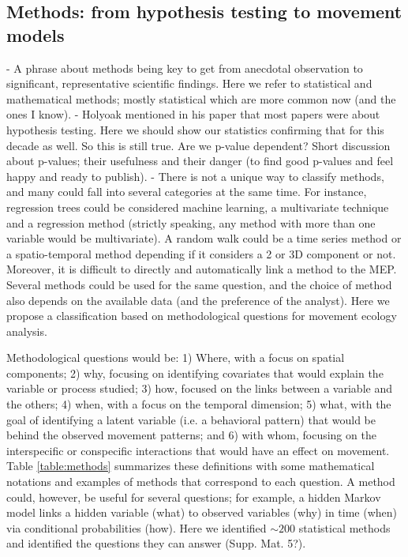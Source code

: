 \documentclass[9pt,twocolumn,twoside,lineno]{pnas-new}
\begin{document}
\subsection*{Methods: from hypothesis testing to movement models}

- A phrase about methods being key to get from anecdotal observation to significant, representative scientific findings. Here we refer to statistical and mathematical methods; mostly statistical which are more common now (and the ones I know).
- Holyoak mentioned in his paper that most papers were about hypothesis testing. Here we should show our statistics confirming that for this decade as well. So this is still true. Are we p-value dependent? Short discussion about p-values; their usefulness and their danger (to find good p-values and feel happy and ready to publish). 
- There is not a unique way to classify methods, and many could fall into several categories at the same time. For instance, regression trees could be considered machine learning, a multivariate technique and a regression method (strictly speaking, any method with more than one variable would be multivariate). A random walk could be a time series method or a spatio-temporal method depending if it considers a 2 or 3D component or not. Moreover, it is difficult to directly and automatically link a method to the MEP. Several methods could be used for the same question, and the choice of method also depends on the available data (and the preference of the analyst). Here we propose a classification based on methodological questions for movement ecology analysis. 

Methodological questions would be: 1) Where, with a focus on spatial components; 2) why, focusing on identifying covariates that would explain the variable or process studied; 3) how, focused on the links between a variable and the others; 4) when, with a focus on the temporal dimension; 5) what, with the goal of identifying a latent variable (i.e. a behavioral pattern) that would be behind the observed movement patterns; and 6) with whom, focusing on the interspecific or conspecific interactions that would have an effect on movement. Table \ref{table:methods} summarizes these definitions with some mathematical notations and examples of methods that correspond to each question. A method could, however, be useful for several questions; for example, a hidden Markov model links a hidden variable (what) to observed variables (why) in time (when) via conditional probabilities (how). Here we identified $\sim 200$ statistical methods and identified the questions they can answer (Supp. Mat. 5?). 
\end{document}
